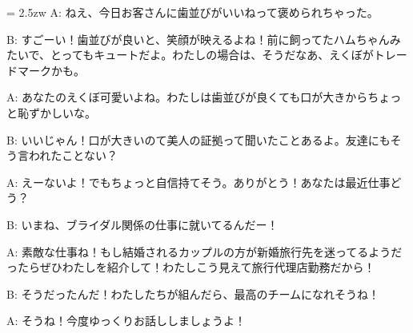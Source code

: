 \documentclass[11pt]{amsart}
\title{}
\author{}
\newenvironment{hangall}[1]{\hangindent = 2.5zw\everypar{\hangindent = 2.5zw}}{}
\begin{document}
\maketitle
\begin{hangall}{}%
A: ねえ、今日お客さんに歯並びがいいねって褒められちゃった。



B: すごーい！歯並びが良いと、笑顔が映えるよね！前に飼ってたハムちゃんみたいで、とってもキュートだよ。わたしの場合は、そうだなあ、えくぼがトレードマークかも。



A: あなたのえくぼ可愛いよね。わたしは歯並びが良くても口が大きからちょっと恥ずかしいな。



B: いいじゃん！口が大きいのて美人の証拠って聞いたことあるよ。友達にもそう言われたことない？



A: えーないよ！でもちょっと自信持てそう。ありがとう！あなたは最近仕事どう？



B: いまね、ブライダル関係の仕事に就いてるんだー！



A: 素敵な仕事ね！もし結婚されるカップルの方が新婚旅行先を迷ってるようだったらぜひわたしを紹介して！わたしこう見えて旅行代理店勤務だから！



B: そうだったんだ！わたしたちが組んだら、最高のチームになれそうね！



A: そうね！今度ゆっくりお話ししましょうよ！\end{hangall}
\end{document}
